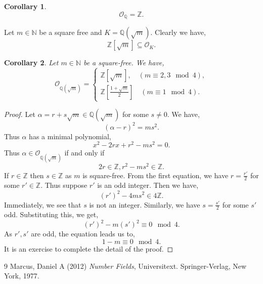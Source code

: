 \documentclass[10pt]{article}
\newtheorem{corollary}{Corollary} [section]
\newcommand{\N}[0]{\mathbb{N}}
\newcommand{\Z}[0]{\mathbb{Z}}
\newcommand{\Q}[0]{\mathbb{Q}}
\newcommand{\Ouv}[0]{\mathcal{O}}
\begin{document}
\begin{corollary}
    \label{corollary_1_5}
    \begin{equation*}
        \Ouv_\Q=\Z.
    \end{equation*}
\end{corollary}
Let $m\in\N$ be a square free and $K=\Q(\sqrt{m})$. Clearly we have,
\begin{equation*}
    \Z[\sqrt{m}]\subseteq\Ouv_K.
\end{equation*}
\begin{corollary}
    \label{corollary_1_6}
    Let $m\in\N$ be a square-free. We have,
    \begin{equation*}
        \Ouv_{\Q(\sqrt{m})} =
        \begin{cases}
            \Z[\sqrt{m}],\quad(m\equiv 2,3\mod{4}),\\
            \Z\left[{\frac {1+\sqrt{m}} 2}\right]\quad (m\equiv1\mod{4}).
        \end{cases}
    \end{equation*}
\end{corollary}
\begin{proof}
    Let $\alpha = r+s\sqrt{m}\in\Q(\sqrt{m})$ for some $s\not=0$. We have,
    \begin{equation*}
        (\alpha-r)^2 = ms^2.
    \end{equation*}
    Thus $\alpha$ has a minimal polynomial,
    \begin{equation*}
        x^2-2rx+r^2-ms^2=0.
    \end{equation*}
    Thus $\alpha\in\Ouv_{\Q(\sqrt{m})}$ if and only if 
    \begin{equation*}
        2r\in\Z,r^2-ms^2\in\Z.
    \end{equation*}
    If $r\in \Z$ then $s\in\Z$ as $m$ is square-free. From the first equation, we have $r={\frac {r'} 2}$ for some $r'\in\Z$. Thus suppose $r'$ is an odd integer. Then we have,
    \begin{equation*}
        (r')^2-4ms^2\in4\Z.
    \end{equation*}
    Immediately, we see that $s$ is not an integer. Similarly, we have $s = {\frac {s'} 2}$ for some $s'$ odd. Substituting this, we get,
    \begin{equation*}
        (r')^2-m(s')^2\equiv 0\mod{4}.
    \end{equation*}
    As $r',s'$ are odd, the equation leads us to,
    \begin{equation*}
        1-m\equiv0\mod{4}.
    \end{equation*}
    It is an exercise to complete the detail of the proof.
\end{proof}
\begin{thebibliography}{9}
Marcus, Daniel A (2012) \emph{Number Fields}, Universitext. Springer-Verlag, New York, 1977.
\end{thebibliography}
\end{document}
